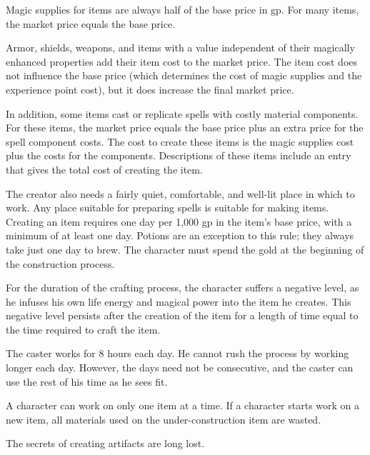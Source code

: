 Magic supplies for items are always half of the base price in gp. For many items, the market price equals the base price.

Armor, shields, weapons, and items with a value independent of their magically enhanced properties add their item cost to the market price. The item cost does not influence the base price (which determines the cost of magic supplies and the experience point cost), but it does increase the final market price.

In addition, some items cast or replicate spells with costly material components. For these items, the market price equals the base price plus an extra price for the spell component costs. The cost to create these items is the magic supplies cost plus the costs for the components. Descriptions of these items include an entry that gives the total cost of creating the item.

The creator also needs a fairly quiet, comfortable, and well-lit place in which to work. Any place suitable for preparing spells is suitable for making items. Creating an item requires one day per 1,000 gp in the item's base price, with a minimum of at least one day. Potions are an exception to this rule; they always take just one day to brew. The character must spend the gold at the beginning of the construction process.

For the duration of the crafting process, the character suffers a negative level, as he infuses his own life energy and magical power into the item he creates. This negative level persists after the creation of the item for a length of time equal to the time required to craft the item.

The caster works for 8 hours each day. He cannot rush the process by working longer each day. However, the days need not be consecutive, and the caster can use the rest of his time as he sees fit.

A character can work on only one item at a time. If a character starts work on a new item, all materials used on the under-construction item are wasted.

The secrets of creating artifacts are long lost.

